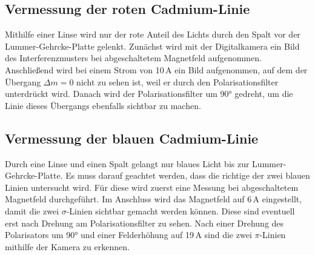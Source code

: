         \subsection{Vermessung der roten Cadmium-Linie}

            Mithilfe einer Linse wird nur der rote Anteil des Lichts durch den Spalt 
            vor der Lummer-Gehrcke-Platte gelenkt. Zunächst wird mit der Digitalkamera 
            ein Bild des Interferenzmusters bei abgeschaltetem Magnetfeld aufgenommen. 
            Anschließend wird bei einem Strom von 10\,A ein Bild aufgenommen, auf dem
            der Übergang $\Delta m = 0$ nicht zu sehen ist, weil er durch den Polarisationsfilter 
            unterdrückt wird. Danach wird der Polarisationsfilter um 90° gedreht, um die Linie 
            dieses Übergangs ebenfalls sichtbar zu machen.

        \subsection{Vermessung der blauen Cadmium-Linie}

            Durch eine Linse und einen Spalt gelangt nur blaues Licht bis zur Lummer-Gehrcke-Platte. 
            Es muss darauf geachtet werden, dass die richtige der zwei blauen Linien untersucht wird. 
            Für diese wird zuerst eine Messung bei abgeschaltetem Magnetfeld durchgeführt. 
            Im Anschluss wird das Magnetfeld auf 6\,A eingestellt, damit die zwei $\sigma$-Linien 
            sichtbar gemacht werden können. Diese sind eventuell erst nach Drehung am Polarisationsfilter
            zu sehen. Nach einer Drehung des Polarisators um 90° und einer Felderhöhung auf 
            19\,A sind die zwei $\pi$-Linien mithilfe der Kamera zu erkennen.
